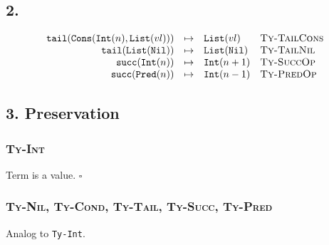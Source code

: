 \documentclass[13pt, a4paper]{article}
\begin{document}
\begin{prooftree}
\end{prooftree}

\begin{prooftree}
\end{prooftree}

\begin{prooftree}
\end{prooftree}

\subsection*{2.} %

\begin{center}
\[
\begin{array}{rcll}
\texttt{tail}(\texttt{Cons}(\texttt{Int}(n), \texttt{List}(vl))) & \mapsto & \texttt{List}(vl) & \textsc{Ty-TailCons} \\
\texttt{tail}(\texttt{List}(\texttt{Nil})) & \mapsto & \texttt{List}(\texttt{Nil}) & \textsc{Ty-TailNil} \\
\texttt{succ}(\texttt{Int}(n)) & \mapsto & \texttt{Int}(n + 1) & \textsc{Ty-SuccOp} \\
\texttt{succ}(\texttt{Pred}(n)) & \mapsto & \texttt{Int}(n - 1) & \textsc{Ty-PredOp} \\
\end{array}
\]
\end{center}

\subsection*{3. Preservation} %

\subsubsection*{\textmd{\textsc{Ty-Int}}}
Term is a value. $\square$

\subsubsection*{\textmd{\textsc{Ty-Nil}, \textsc{Ty-Cond}, \textsc{Ty-Tail}, \textsc{Ty-Succ}, \textsc{Ty-Pred}}}
Analog to \texttt{Ty-Int}.
\end{document}
